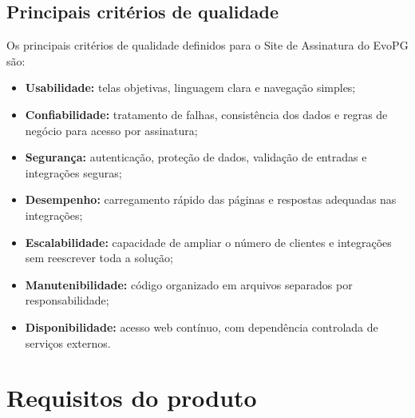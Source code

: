 \documentclass[
  12pt,
  openany,
  oneside,
  a4paper,
  brazil
]{abntex2}
\newcommand{\ProjetoNome}{Site de Assinatura do EvoPG}
\begin{document}
\section{Principais crit\'erios de qualidade}
Os principais crit\'erios de qualidade definidos para o \ProjetoNome{} s\~ao:
\begin{itemize}
  \item \textbf{Usabilidade:} telas objetivas, linguagem clara e navega\c{c}\~ao simples;
  \item \textbf{Confiabilidade:} tratamento de falhas, consist\^encia dos dados e regras de neg\'ocio para acesso por assinatura;
  \item \textbf{Seguran\c{c}a:} autentica\c{c}\~ao, prote\c{c}\~ao de dados, valida\c{c}\~ao de entradas e integra\c{c}\~oes seguras;
  \item \textbf{Desempenho:} carregamento r\'apido das p\'aginas e respostas adequadas nas integra\c{c}\~oes;
  \item \textbf{Escalabilidade:} capacidade de ampliar o n\'umero de clientes e integra\c{c}\~oes sem reescrever toda a solu\c{c}\~ao;
  \item \textbf{Manutenibilidade:} c\'odigo organizado em arquivos separados por responsabilidade;
  \item \textbf{Disponibilidade:} acesso web cont\'inuo, com depend\^encia controlada de servi\c{c}os externos.
\end{itemize}

\chapter{Requisitos do produto}
\end{document}
